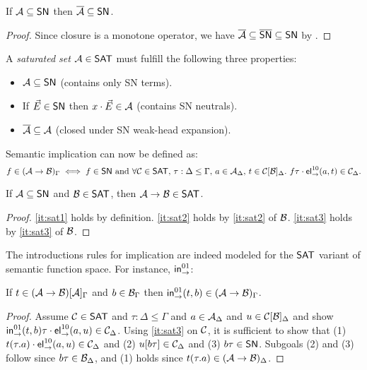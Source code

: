 \begin{corollary}
  \label{cor:sat-preserves-sn}
  If $\mathcal{A} \subseteq \mathsf{SN}$ then $\overline{\mathcal{A}} \subseteq \mathsf{SN}$.
\end{corollary}
\begin{proof}
  Since closure is a monotone operator, we have $\overline{\mathcal{A}} \subseteq
  \overline{\mathsf{SN}} \subseteq \mathsf{SN}$ by .
\end{proof}

A \emph{saturated set} $\mathcal{A} \in \mathsf{SAT}$ must fulfill the following three
properties:
\begin{itemize}%
\setlength{\itemindent}{2.7em}

\item[\namedlabel{it:sat1}{SAT1}]
$\mathcal{A} \subseteq \mathsf{SN}$ (contains only SN terms).

\item[\namedlabel{it:sat2}{SAT2}]
If $\vec E \in \mathsf{SN}$ then $x \cdot \vec E \in \mathcal{A}$ (contains SN
neutrals).

\item[\namedlabel{it:sat3}{SAT3}]
$\overline{\mathcal{A}} \subseteq \mathcal{A}$ (closed under SN weak-head expansion).

\end{itemize}

Semantic implication can now be defined as:
\[
  f \in (\mathcal{A} \to \mathcal{B})_\Gamma
  \iff
  f \in \mathsf{SN} \mbox{ and }
  \forall \mathcal{C} \in \mathsf{SAT}, \,
  \tau : \Delta \leq \Gamma, \,
  a \in \mathcal{A}_\Delta, \,
  t \in \mathcal{C}[\mathcal{B}]_\Delta.\
  f\tau \cdot \mathsf{el}_{\to}^{10}(a,t) \in \mathcal{C}_\Delta .
\]

\begin{lemma}
  \label{lem:fun-sat}
  If $\mathcal{A} \subseteq \mathsf{SN}$ and $\mathcal{B} \in \mathsf{SAT}$, then $\mathcal{A} \to \mathcal{B} \in \mathsf{SAT}$.
\end{lemma}
\begin{proof}
  \ref{it:sat1} holds by definition.
  \ref{it:sat2} holds by \ref{it:sat2} of $\mathcal{B}$.
  \ref{it:sat3} holds by \ref{it:sat3} of $\mathcal{B}$.
\end{proof}

The introductions rules for implication are indeed modeled for the
$\mathsf{SAT}$ variant of semantic function space.  For instance, $\mathsf{in}_{\to}^{01}$:
\begin{lemma}
  \label{lem:intro-sat}
  If $t \in (\mathcal{A} \to \mathcal{B})[\mathcal{A}]_{\Gamma}$
  and $b \in \mathcal{B}_{\Gamma}$ then
  $\mathsf{in}_{\to}^{01}(t,b) \in (\mathcal{A} \to \mathcal{B})_{\Gamma}$.
\end{lemma}
\begin{proof}
  Assume
  $\mathcal{C} \in \mathsf{SAT}$ and
  $\tau : \Delta \leq \Gamma$ and
  $a \in \mathcal{A}_{\Delta}$ and $u \in \mathcal{C}[\mathcal{B}]_{\Delta}$ and
  show
  $\mathsf{in}_{\to}^{01}(t,b)\tau \cdot \mathsf{el}_{\to}^{10}(a,u) \in \mathcal{C}_{\Delta}$.
  Using \ref{it:sat3} on $\mathcal{C}$, it is sufficient to show that
  (1) $t(\tau.a) \cdot \mathsf{el}_{\to}^{10}(a,u) \in \mathcal{C}_{\Delta}$ and
  (2) $u[b\tau] \in \mathcal{C}_{\Delta}$ and
  (3) $b\tau \in \mathsf{SN}$.
  Subgoals (2) and (3) follow since $b\tau \in \mathcal{B}_{\Delta}$,
  and (1) holds since $t(\tau.a) \in (\mathcal{A} \to \mathcal{B})_{\Delta}$.
\end{proof}


